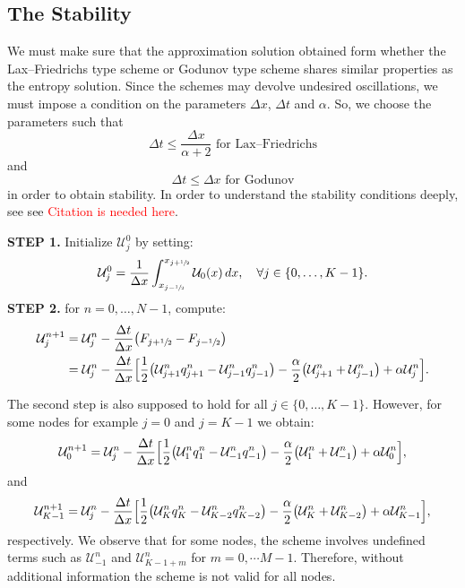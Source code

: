 
\subsection{The Stability}

We must make sure that the approximation solution obtained form whether the Lax--Friedrichs type scheme or Godunov type scheme shares similar properties as the entropy solution. Since the schemes may devolve undesired oscillations, we must impose a condition on the parameters $\Delta x$, $\Delta t$ and $\alpha$. So, we choose the parameters such that
\begin{equation}\label{eq:stability LF}
    \Delta t \leq \frac{\Delta x}{\alpha +2} \text{ for Lax--Friedrichs}
\end{equation}
and
\begin{equation}\label{eq:stability Gud}
    \Delta t \leq \Delta x \text{ for Godunov}
\end{equation}
in order to obtain stability. In order to understand the stability conditions deeply, see see \textcolor{red}{Citation is needed here}.

\textbf{STEP 1.} Initialize $\mathcal{U}_{j}^{0}$ by setting:
\begin{align*}
    \mathcal{U}_{j}^{0} = \frac{1}{\Delta x}\int_{x_{j-\sfrac{1}{2}}}^{x_{j+\sfrac{1}{2}}} \mathcal{U}_{0}(x)\,dx, \quad \forall j \in \{0,\dots,K-1\}.
\end{align*}
\textbf{STEP 2.}   for $n = 0,\dots,N-1$, compute:
\begin{align*}
    \mathcal{U}_{j}^{n+1} & = \mathcal{U}_{j}^{n} - \frac{\Delta t}{\Delta x}\bigl(F_{j+\sfrac{1}{2}} - F_{j-\sfrac{1}{2}}\bigr)                                                                                                                                                              \\
                          & =  \mathcal{U}_{j}^{n} - \frac{\Delta t}{\Delta x} \Bigl[\frac{1}{2}\bigl(\mathcal{U}_{j+1}^{n}q_{j+1}^{n} - \mathcal{U}_{j-1}^{n}q_{j-1}^{n}\bigr) - \frac{\alpha}{2}\big(\mathcal{U}_{j+1}^{n} + \mathcal{U}_{j-1}^{n}\big) + \alpha \mathcal{U}_{j}^{n}\Bigr].
\end{align*}

The second step is also supposed to hold for all $j \in \{0,\dots,K-1\}$. However, for some nodes for example $j = 0$ and  $j = K-1$ we obtain:
\[
    \mathcal{U}_{0}^{n+1} = \mathcal{U}_{j}^{n} - \frac{\Delta t}{\Delta x} \Bigl[\frac{1}{2}\big(\mathcal{U}_{1}^{n}q_{1}^{n} - \mathcal{U}_{-1}^{n}q_{-1}^{n}\big) - \frac{\alpha}{2}\big(\mathcal{U}_{1}^{n} + \mathcal{U}_{-1}^{n}\big) + \alpha \mathcal{U}_{0}^{n}\Bigr],
\]
and
\[
    \mathcal{U}_{K-1}^{n+1} = \mathcal{U}_{j}^{n} - \frac{\Delta t}{\Delta x} \Bigl[ \frac{1}{2}\big(\mathcal{U}_{K}^{n}q_{K}^{n} - \mathcal{U}_{K-2}^{n}q_{K-2}^{n}\big) - \frac{\alpha}{2}\big(\mathcal{U}_{K}^{n} + \mathcal{U}_{K-2}^{n}\big) + \alpha \mathcal{U}_{K-1}^{n}\Bigr],
\]
respectively.
We observe that for some nodes, the scheme involves undefined terms such as $\mathcal{U}_{-1}^{n}$ and $\mathcal{U}_{K-1+m}^{n}$ for $ m = 0, \cdots M-1$. Therefore, without additional information the scheme is not valid for all nodes.

